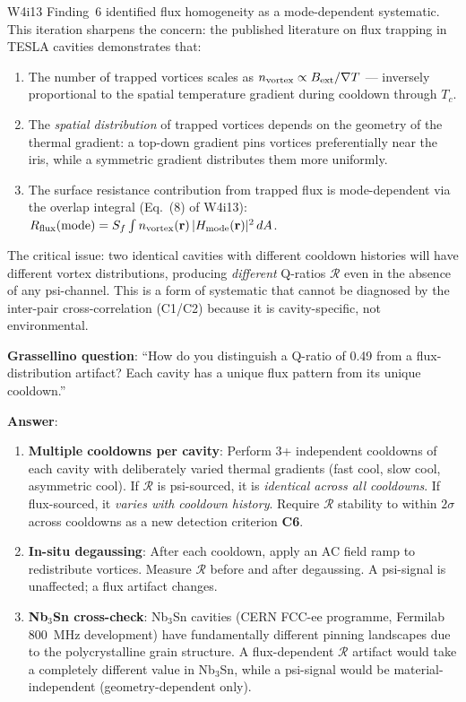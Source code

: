 \documentclass[11pt]{article}
\theoremstyle{definition}
\theoremstyle{remark}
\begin{document}
\begin{tcolorbox}[colback=blue!5!white, colframe=blue!60!black,
  title=\textbf{W4i14 TOP 5 FINDINGS --- Ranked by Programme Impact}]
\begin{enumerate}
W4i13 Finding~6 identified flux homogeneity as a mode-dependent
systematic. This iteration sharpens the concern: the published
literature on flux trapping in TESLA cavities demonstrates that:

\begin{enumerate}[nosep]
\item The number of trapped vortices scales as $n_{\rm vortex} \propto
  B_{\rm ext}/\nabla T$ --- inversely proportional to the spatial
  temperature gradient during cooldown through $T_c$.
\item The \emph{spatial distribution} of trapped vortices depends on the
  geometry of the thermal gradient: a top-down gradient pins vortices
  preferentially near the iris, while a symmetric gradient distributes
  them more uniformly.
\item The surface resistance contribution from trapped flux is
  mode-dependent via the overlap integral (Eq.~(8) of W4i13):
  $R_{\rm flux}(\text{mode}) = S_f \int n_{\rm vortex}(\mathbf{r})\,
  |H_{\rm mode}(\mathbf{r})|^2\,dA$.
\end{enumerate}

The critical issue: two identical cavities with different cooldown
histories will have different vortex distributions, producing
\emph{different} Q-ratios $\mathcal{R}$ even in the absence of any
psi-channel. This is a form of systematic that cannot be diagnosed
by the inter-pair cross-correlation (C1/C2) because it is
cavity-specific, not environmental.

\textbf{Grassellino question}: ``How do you distinguish a Q-ratio
of 0.49 from a flux-distribution artifact? Each cavity has a unique
flux pattern from its unique cooldown.''

\textbf{Answer}:
\begin{enumerate}[nosep]
\item \textbf{Multiple cooldowns per cavity}: Perform 3+ independent
  cooldowns of each cavity with deliberately varied thermal gradients
  (fast cool, slow cool, asymmetric cool). If $\mathcal{R}$ is
  psi-sourced, it is \emph{identical across all cooldowns}. If
  flux-sourced, it \emph{varies with cooldown history}. Require
  $\mathcal{R}$ stability to within $2\sigma$ across cooldowns as
  a new detection criterion \textbf{C6}.
\item \textbf{In-situ degaussing}: After each cooldown, apply an
  AC field ramp to redistribute vortices. Measure $\mathcal{R}$
  before and after degaussing. A psi-signal is unaffected; a
  flux artifact changes.
\item \textbf{Nb$_3$Sn cross-check}: Nb$_3$Sn cavities (CERN
  FCC-ee programme, Fermilab 800~MHz development) have fundamentally
  different pinning landscapes due to the polycrystalline grain
  structure. A flux-dependent $\mathcal{R}$ artifact would take a
  completely different value in Nb$_3$Sn, while a psi-signal would
  be material-independent (geometry-dependent only).
\end{enumerate}


\end{enumerate}
\end{tcolorbox}
\end{document}
